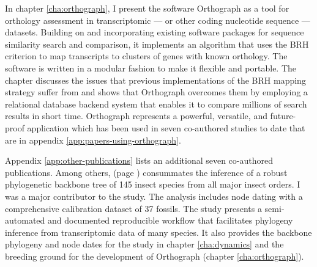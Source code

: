 In chapter \ref{cha:orthograph}, I present the software Orthograph as a
tool for orthology assessment in transcriptomic --- or other coding
nucleotide sequence --- datasets.  Building on and incorporating existing
software packages for sequence similarity search and comparison, it
implements an algorithm that uses the BRH criterion to map transcripts
to clusters of genes with known orthology.  The software is written in a
modular fashion to make it flexible and portable.  The chapter discusses the
issues that previous implementations of the BRH mapping strategy suffer
from and shows that Orthograph overcomes them by employing a relational
database backend system that enables it to compare millions of search
results in short time.  Orthograph represents a powerful, versatile, and
future-proof application which has been used in seven co-authored
studies to date \citep{Mayer2016, Pauli2016, Bank2017, Dowling2017, Peters2017,
Gillung2018, Johnson2018, Wipfler2019} that are in appendix
\ref{app:papers-using-orthograph}.

Appendix \ref{app:other-publications} lists an additional seven
co-authored publications.  Among others, \citet{Misof2014} (page
\pageref{app:Misof2014}) consummates the inference of a robust
phylogenetic backbone tree of 145 insect species from all major insect
orders.  I was a major contributor to the study.  The analysis includes
node dating with a comprehensive calibration dataset of 37 fossils.  The
study presents a semi-automated and documented reproducible workflow
that facilitates phylogeny inference from transcriptomic data of many
species.  It also provides the backbone phylogeny and node dates for the
study in chapter \ref{cha:dynamics} and the breeding ground for the
development of Orthograph (chapter \ref{cha:orthograph}).



